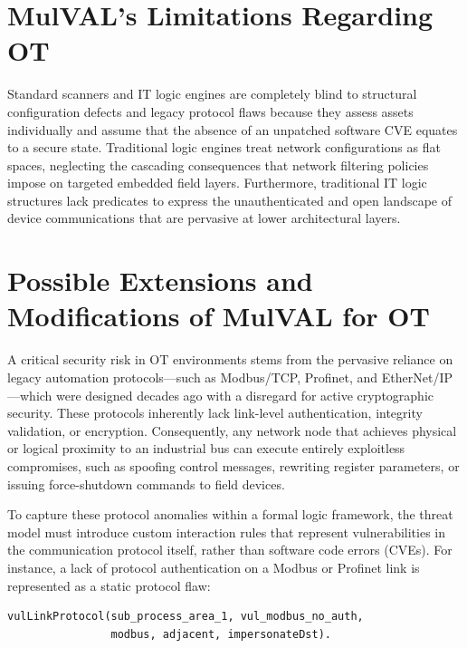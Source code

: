 \documentclass[target=mst,aauheader=aics,style=]{thud}
\begin{document}
\section{MulVAL's Limitations Regarding OT}
Standard scanners and IT logic engines are completely blind to structural configuration defects and legacy protocol flaws because they assess assets individually and assume that the absence of an unpatched software CVE equates to a secure state. Traditional logic engines treat network configurations as flat spaces, neglecting the cascading consequences that network filtering policies impose on targeted embedded field layers. Furthermore, traditional IT logic structures lack predicates to express the unauthenticated and open landscape of device communications that are pervasive at lower architectural layers.

\section{Possible Extensions and Modifications of MulVAL for OT}
A critical security risk in OT environments stems from the pervasive reliance on legacy automation protocols—such as Modbus/TCP, Profinet, and EtherNet/IP—which were designed decades ago with a disregard for active cryptographic security. These protocols inherently lack link-level authentication, integrity validation, or encryption. Consequently, any network node that achieves physical or logical proximity to an industrial bus can execute entirely exploitless compromises, such as spoofing control messages, rewriting register parameters, or issuing force-shutdown commands to field devices.

To capture these protocol anomalies within a formal logic framework, the threat model must introduce custom interaction rules that represent vulnerabilities in the communication protocol itself, rather than software code errors (CVEs). For instance, a lack of protocol authentication on a Modbus or Profinet link is represented as a static protocol flaw: 
\begin{verbatim}
vulLinkProtocol(sub_process_area_1, vul_modbus_no_auth, 
                modbus, adjacent, impersonateDst). 
\end{verbatim}
\end{document}
